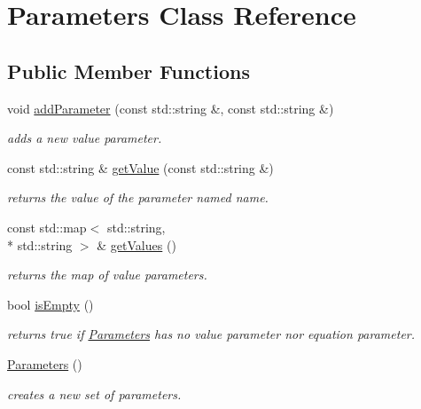 \hypertarget{class_open_chams_1_1_parameters}{\section{Parameters Class Reference}
\label{class_open_chams_1_1_parameters}
}
\subsection*{Public Member Functions}
\begin{DoxyCompactItemize}
\item 
void \hyperlink{class_open_chams_1_1_parameters_a9ad9a7acc15a142788270ccd255b5e91}{add\-Parameter} (const std\-::string \&, const std\-::string \&)
\begin{DoxyCompactList}\small\item\em adds a new value parameter. \end{DoxyCompactList}\item 
const std\-::string \& \hyperlink{class_open_chams_1_1_parameters_a41b343d6037f531fd92912b453b40f2b}{get\-Value} (const std\-::string \&)
\begin{DoxyCompactList}\small\item\em returns the value of the parameter named {\ttfamily name}. \end{DoxyCompactList}\item 
\hypertarget{class_open_chams_1_1_parameters_a0f890d16c3b2a0bcbdf060854ea07877}{const std\-::map$<$ std\-::string, \\*
std\-::string $>$ \& \hyperlink{class_open_chams_1_1_parameters_a0f890d16c3b2a0bcbdf060854ea07877}{get\-Values} ()}\label{class_open_chams_1_1_parameters_a0f890d16c3b2a0bcbdf060854ea07877}

\begin{DoxyCompactList}\small\item\em returns the map of value parameters. \end{DoxyCompactList}\item 
\hypertarget{class_open_chams_1_1_parameters_af337ffd75e4f019ce15302c60715d84b}{bool \hyperlink{class_open_chams_1_1_parameters_af337ffd75e4f019ce15302c60715d84b}{is\-Empty} ()}\label{class_open_chams_1_1_parameters_af337ffd75e4f019ce15302c60715d84b}

\begin{DoxyCompactList}\small\item\em returns true if \hyperlink{class_open_chams_1_1_parameters}{Parameters} has no value parameter nor equation parameter. \end{DoxyCompactList}\item 
\hypertarget{class_open_chams_1_1_parameters_a061bbedbf4fbd963871a388f5e8ebb61}{\hyperlink{class_open_chams_1_1_parameters_a061bbedbf4fbd963871a388f5e8ebb61}{Parameters} ()}\label{class_open_chams_1_1_parameters_a061bbedbf4fbd963871a388f5e8ebb61}

\begin{DoxyCompactList}\small\item\em creates a new set of parameters. \end{DoxyCompactList}\end{DoxyCompactItemize}


